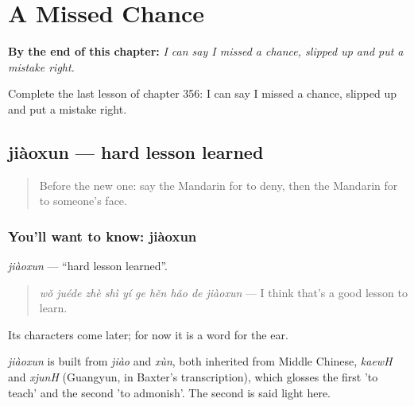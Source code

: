 
\chapter{A Missed Chance}
\label{ch:zh-a-missed-chance}

\begin{chapteropening}
\textbf{By the end of this chapter:} \emph{I can say I missed a chance, slipped up and put a mistake right.}

Complete the last lesson of chapter 356: I can say I missed a chance, slipped up and put a mistake right.
\end{chapteropening}

\section[jiàoxun]{jiàoxun — hard lesson learned}

\label{lesson:ZH-C356-jiaoxun}



\begin{quote}
Before the new one: say the Mandarin for to deny, then the Mandarin for to someone's face.
\end{quote}

\subsection*{You'll want to know: jiàoxun}
\emph{jiàoxun} — \textquotedblleft{}hard lesson learned\textquotedblright{}.

\begin{quote}
\emph{wǒ juéde zhè shì yí ge hěn hǎo de jiàoxun} — I think that's a good lesson to learn.
\end{quote}

Its characters come later; for now it is a word for the ear.

\begin{cousinweb}
\emph{jiàoxun} is built from \emph{jiào} and \emph{xùn}, both inherited from Middle Chinese, \emph{kaewH} and \emph{xjunH} (Guangyun, in Baxter's transcription), which glosses the first 'to teach' and the second 'to admonish'. The second is said light here.
\end{cousinweb}

